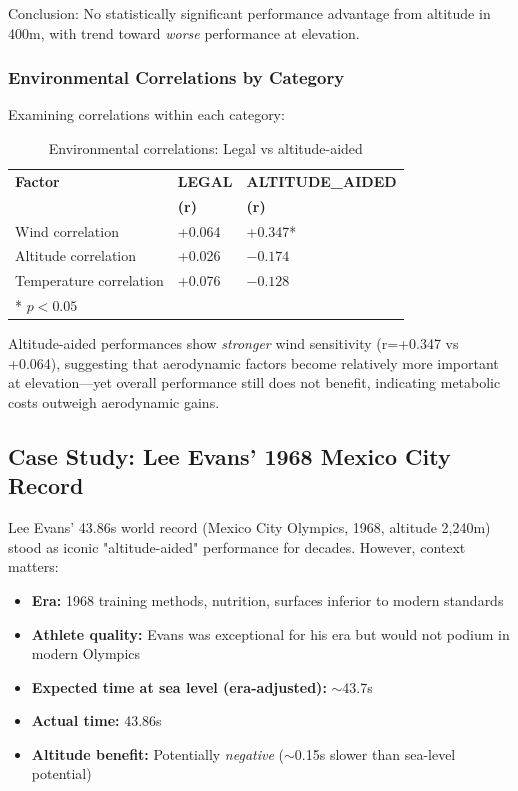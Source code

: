 Conclusion: No statistically significant performance advantage from altitude in 400m, with trend toward \textit{worse} performance at elevation.

\subsubsection{Environmental Correlations by Category}

Examining correlations within each category:

\begin{table}[H]
\centering
\caption{Environmental correlations: Legal vs altitude-aided}
\begin{tabular}{@{}lll@{}}
\toprule
\textbf{Factor} & \textbf{LEGAL} & \textbf{ALTITUDE\_AIDED} \\
 & \textbf{(r)} & \textbf{(r)} \\
\midrule
Wind correlation & +0.064 & +0.347* \\
Altitude correlation & +0.026 & $-0.174$ \\
Temperature correlation & +0.076 & $-0.128$ \\
\bottomrule
\multicolumn{3}{l}{\small{* $p < 0.05$}}
\end{tabular}
\end{table}

Altitude-aided performances show \textit{stronger} wind sensitivity (r=+0.347 vs +0.064), suggesting that aerodynamic factors become relatively more important at elevation—yet overall performance still does not benefit, indicating metabolic costs outweigh aerodynamic gains.

\subsection{Case Study: Lee Evans' 1968 Mexico City Record}

Lee Evans' 43.86s world record (Mexico City Olympics, 1968, altitude 2,240m) stood as iconic "altitude-aided" performance for decades. However, context matters:

\begin{itemize}
    \item \textbf{Era:} 1968 training methods, nutrition, surfaces inferior to modern standards
    \item \textbf{Athlete quality:} Evans was exceptional for his era but would not podium in modern Olympics
    \item \textbf{Expected time at sea level (era-adjusted):} $\sim$43.7s
    \item \textbf{Actual time:} 43.86s
    \item \textbf{Altitude benefit:} Potentially \textit{negative} ($\sim$0.15s slower than sea-level potential)
\end{itemize}

